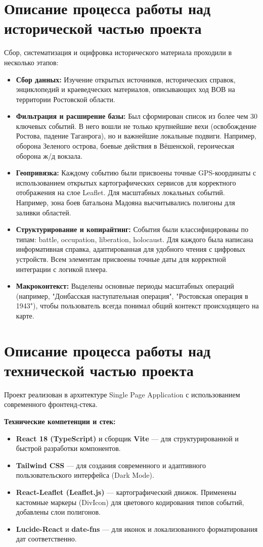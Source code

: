 \documentclass[a4paper,12pt]{article}
\begin{document}
\section*{Описание процесса работы над исторической частью проекта}
Сбор, систематизация и оцифровка исторического материала проходили в несколько этапов:
\begin{itemize}
    \item \textbf{Сбор данных:} Изучение открытых источников, исторических справок, энциклопедий и краеведческих материалов, описывающих ход ВОВ на территории Ростовской области.
    \item \textbf{Фильтрация и расширение базы:} Был сформирован список из более чем 30 ключевых событий. В него вошли не только крупнейшие вехи (освобождение Ростова, падение Таганрога), но и важнейшие локальные подвиги. Например, оборона Зеленого острова, боевые действия в Вёшенской, героическая оборона ж/д вокзала.
    \item \textbf{Геопривязка:} Каждому событию были присвоены точные GPS-координаты с использованием открытых картографических сервисов для корректного отображения на слое Leaflet. Для масштабных локальных событий. Например, зона боев батальона Мадояна высчитывались полигоны для заливки областей.
    \item \textbf{Структурирование и копирайтинг:} События были классифицированы по типам: battle, occupation, liberation, holocaust. Для каждого была написана информативная справка, адаптированная для удобного чтения с цифровых устройств. Всем элементам присвоены точные даты для корректной интеграции с логикой плеера.
    \item \textbf{Макроконтекст:} Выделены основные периоды масштабных операций (например, "Донбасская наступательная операция", "Ростовская операция в 1943"), чтобы пользователь всегда понимал общий контекст происходящего на карте.
\end{itemize}

\section*{Описание процесса работы над технической частью проекта}
Проект реализован в архитектуре Single Page Application с использованием современного фронтенд-стека.

\textbf{Технические компетенции и стек:}
\begin{itemize}
    \item \textbf{React 18 (TypeScript)} и сборщик \textbf{Vite} — для структурированной и быстрой разработки компонентов.
    \item \textbf{Tailwind CSS} — для создания современного и адаптивного пользовательского интерфейса (Dark Mode).
    \item \textbf{React-Leaflet (Leaflet.js)} — картографический движок. Применены кастомные маркеры (DivIcon) для цветового кодирования типов событий, добавлены слои полигонов.
    \item \textbf{Lucide-React} и \textbf{date-fns} — для иконок и локализованного форматирования дат соответственно.
\end{itemize}
\end{document}
